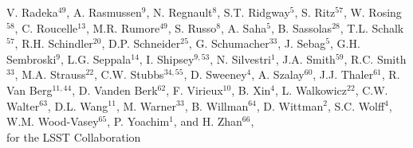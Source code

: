 {V. Radeka$^{49}$,   
A. Rasmussen$^9$,
N. Regnault$^8$,  
S.T. Ridgway$^5$, 
S. Ritz$^{57}$, 
W. Rosing$^{58}$,
C. Roucelle$^{13}$, 
M.R. Rumore$^{49}$, 
S. Russo$^8$,  
A. Saha$^{5}$,     
B. Sassolas$^{28}$, 
T.L. Schalk$^{57}$,     
R.H. Schindler$^{20}$,
D.P. Schneider$^{25}$,    
G. Schumacher$^{33}$,
J. Sebag$^5$,
G.H. Sembroski$^9$, 
L.G. Seppala$^{14}$,
I. Shipsey$^{9,53}$,
N. Silvestri$^1$,
J.A. Smith$^{59}$,    
R.C. Smith$^{33}$,
M.A. Strauss$^{22}$,     
C.W. Stubbs$^{34,55}$,
D. Sweeney$^4$,
A. Szalay$^{60}$,
J.J. Thaler$^{61}$,
R. Van Berg$^{11,44}$, 
D. Vanden Berk$^{62}$,  
F. Virieux$^{10}$, 
B. Xin$^4$,
L. Walkowicz$^{22}$,
C.W. Walter$^{63}$, 
D.L. Wang$^{11}$,
M. Warner$^{33}$,
B. Willman$^{64}$,
D. Wittman$^2$,
S.C. Wolff$^4$, 
W.M. Wood-Vasey$^{65}$,  
P. Yoachim$^1$,
and H. Zhan$^{66}$, \\
for the LSST Collaboration
}
\affil{}

